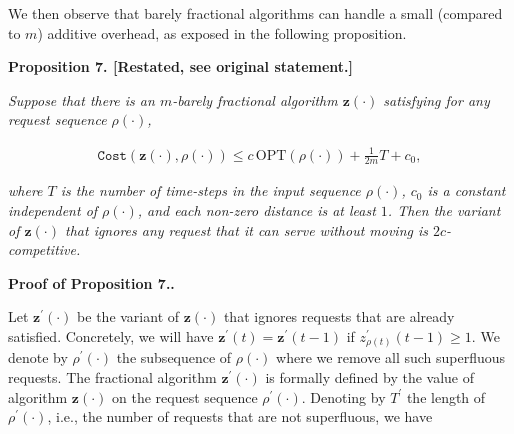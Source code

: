 \documentclass[10pt,a4paper]{article}
\begin{document}
We then observe that barely fractional algorithms can handle a small (compared to $m$) additive overhead, as exposed in the following proposition.\par






\par\medskip\noindent\textbf{
\textbf{Proposition 7}\textbf{.}
[Restated, see original statement.]}\par



\emph{Suppose that there is an $m$-barely fractional algorithm ${\mathbf{z}}(\cdot)$ satisfying for any request sequence $\rho(\cdot)$,}\par


\[\begin{gathered}
{\texttt{Cost}}({\mathbf{z}}(\cdot),\rho(\cdot))\leq c\,{\text{OPT}}(\rho(\cdot))+\frac{1}{2m}T+c_{0},
\end{gathered}\]


\emph{where $T$ is the number of time-steps in the input sequence $\rho(\cdot)$, $c_{0}$ is a constant independent of $\rho(\cdot)$, and each non-zero distance is at least $1$. Then the variant of ${\mathbf{z}}(\cdot)$ that ignores any request that it can serve without moving is $2c$-competitive.}\par








\par\medskip\noindent\textbf{Proof of Proposition 7..}\par




Let ${\mathbf{z}}^{\prime}(\cdot)$ be the variant of ${\mathbf{z}}(\cdot)$ that ignores requests that are already satisfied. Concretely, we will have ${\mathbf{z}}^{\prime}(t)={\mathbf{z}}^{\prime}(t-1)$ if $z^{\prime}_{\rho(t)}(t-1)\geq 1$. We denote by $\rho^{\prime}(\cdot)$ the subsequence of $\rho(\cdot)$ where we remove all such superfluous requests. The fractional algorithm ${\mathbf{z}}^{\prime}(\cdot)$ is formally defined by the value of algorithm ${\mathbf{z}}(\cdot)$ on the request sequence $\rho^{\prime}(\cdot)$. Denoting by $T^{\prime}$ the length of $\rho^{\prime}(\cdot)$, i.e., the number of requests that are not superfluous, we have\par
\end{document}
